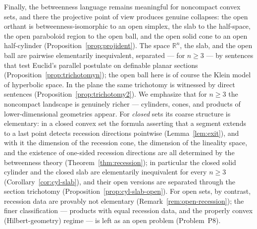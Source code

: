 \documentclass[11pt]{amsart}
\theoremstyle{definition}
\newcommand{\R}{\mathbb{R}}
\begin{document}
Finally, the betweenness language remains meaningful for noncompact convex
sets, and there the projective point of view produces genuine collapses: the
open orthant is betweenness-isomorphic to an open simplex, the slab to the
half-space, the open paraboloid region to the open ball, and the open solid
cone to an open half-cylinder (Proposition~\ref{prop:projident}). The space
$\R^n$, the slab, and the open ball are pairwise elementarily inequivalent,
separated --- for $n\ge3$ --- by sentences that test Euclid's parallel postulate
on definable planar sections (Proposition~\ref{prop:trichotomyn}); the open
ball here is of course the Klein model of hyperbolic space. In the plane the
same trichotomy is witnessed by direct sentences
(Proposition~\ref{prop:trichotomy2}). We emphasize that for $n\ge3$ the
noncompact landscape is genuinely richer --- cylinders, cones, and products of
lower-dimensional geometries appear. For \emph{closed} sets its coarse
structure is elementary: in a closed convex set the formula asserting that a
segment extends to a last point detects recession directions pointwise
(Lemma~\ref{lem:exit}), and with it the dimension of the recession cone, the
dimension of the lineality space, and the existence of one-sided recession
directions are all determined by the betweenness theory
(Theorem~\ref{thm:recession}); in particular the closed solid cylinder and
the closed slab are elementarily inequivalent for every $n\ge3$
(Corollary~\ref{cor:cyl-slab}), and their open versions are separated through
the section trichotomy (Proposition~\ref{prop:cyl-slab-open}). For open sets,
by contrast, recession data are provably not elementary
(Remark~\ref{rem:open-recession}); the finer classification --- products with
equal recession data, and the properly convex (Hilbert-geometry) regime ---
is left as an open problem (Problem~P8).
\end{document}
